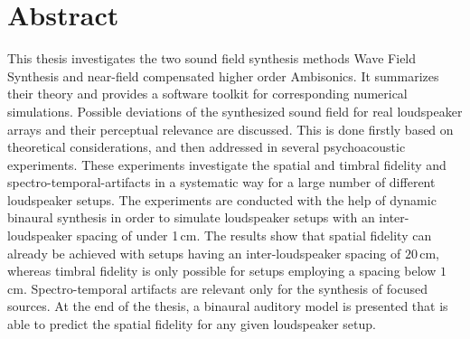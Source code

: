 \newpage

\chapter*{Abstract}
%
This thesis investigates the two sound field synthesis methods
Wave Field Synthesis and near-field compensated higher order Ambisonics. It
summarizes their theory and provides a software toolkit for corresponding
numerical simulations. Possible deviations of the synthesized sound field for
real loudspeaker arrays and their perceptual relevance are discussed. This is
done firstly based on theoretical considerations, and then addressed in several
psychoacoustic experiments. These experiments investigate the spatial and
timbral fidelity and spectro-temporal-artifacts in a systematic way for a large
number of different loudspeaker setups. The experiments are conducted with the
help of dynamic binaural synthesis in order to simulate loudspeaker setups with
an inter-loudspeaker spacing of under 1\,cm.
The results show that spatial fidelity can already be achieved with setups
having an inter-loudspeaker spacing of $20$\,cm,
whereas timbral fidelity is only possible for setups employing a spacing below
$1$\,cm.
Spectro-temporal artifacts are relevant only for the synthesis of focused
sources.
At the end of the thesis, a binaural auditory model is presented that is able
to predict the spatial fidelity for any given loudspeaker setup.


\newpage
